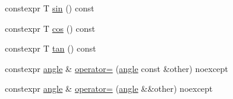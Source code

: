 \begin{DoxyCompactItemize}
\item 
constexpr T \mbox{\hyperlink{classpyrite_1_1math_1_1angle_a52b2bed9f8df78271f96ee0c79f8c8a8}{sin}} () const
\item 
constexpr T \mbox{\hyperlink{classpyrite_1_1math_1_1angle_a5126aac02ec54f94df6aecac8e9d9e9a}{cos}} () const
\item 
constexpr T \mbox{\hyperlink{classpyrite_1_1math_1_1angle_a1d63fa42bc9004aa686fe2992f235ebb}{tan}} () const
\item 
constexpr \mbox{\hyperlink{classpyrite_1_1math_1_1angle}{angle}} \& \mbox{\hyperlink{classpyrite_1_1math_1_1angle_aaa7837421f293c5d2938442efcd6cc02}{operator=}} (\mbox{\hyperlink{classpyrite_1_1math_1_1angle}{angle}} const \&other) noexcept
\item 
constexpr \mbox{\hyperlink{classpyrite_1_1math_1_1angle}{angle}} \& \mbox{\hyperlink{classpyrite_1_1math_1_1angle_acf9aa48fe206f5bdc202479bb9f0354a}{operator=}} (\mbox{\hyperlink{classpyrite_1_1math_1_1angle}{angle}} \&\&other) noexcept
\end{DoxyCompactItemize}
